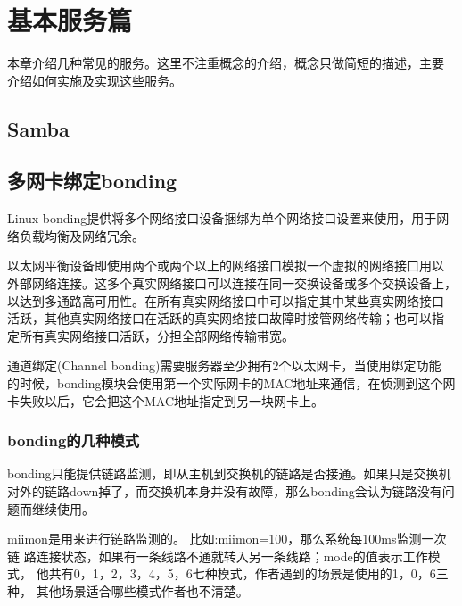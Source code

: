 \part{基本服务篇}

本章介绍几种常见的服务。这里不注重概念的介绍，概念只做简短的描述，主要
介绍如何实施及实现这些服务。











\chapter{Samba}







\chapter{多网卡绑定bonding}

Linux bonding提供将多个网络接口设备捆绑为单个网络接口设置来使用，用于网
络负载均衡及网络冗余。

以太网平衡设备即使用两个或两个以上的网络接口模拟一个虚拟的网络接口用以
外部网络连接。这多个真实网络接口可以连接在同一交换设备或多个交换设备上，
以达到多通路高可用性。在所有真实网络接口中可以指定其中某些真实网络接口
活跃，其他真实网络接口在活跃的真实网络接口故障时接管网络传输；也可以指
定所有真实网络接口活跃，分担全部网络传输带宽。
 
通道绑定(Channel bonding)需要服务器至少拥有2个以太网卡，当使用绑定功能
的时候，bonding模块会使用第一个实际网卡的MAC地址来通信，在侦测到这个网
卡失败以后，它会把这个MAC地址指定到另一块网卡上。

\section{bonding的几种模式}

bonding只能提供链路监测，即从主机到交换机的链路是否接通。如果只是交换机
对外的链路down掉了，而交换机本身并没有故障，那么bonding会认为链路没有问
题而继续使用。
 
miimon是用来进行链路监测的。 比如:miimon=100，那么系统每100ms监测一次链
路连接状态，如果有一条线路不通就转入另一条线路；mode的值表示工作模式，
他共有0，1，2，3，4，5，6七种模式，作者遇到的场景是使用的1，0，6三种，
其他场景适合哪些模式作者也不清楚。
 
